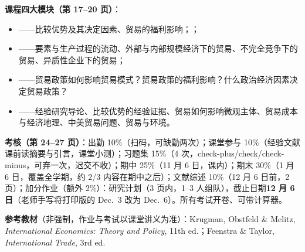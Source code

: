 
\textbf{课程四大模块（第 17--20 页）}：
\begin{itemize}
  \item {}——比较优势及其决定因素、贸易的福利影响；；
  \item {}——要素与生产过程的流动、外部与内部规模经济下的贸易、不完全竞争下的贸易、异质性企业下的贸易；
  \item {}——贸易政策如何影响贸易模式？贸易政策的福利影响？什么政治经济因素决定贸易政策？
  \item {}——经验研究导论、比较优势的经验证据、贸易如何影响微观主体、贸易成本与经济地理、中美贸易问题、贸易与环境。
\end{itemize}

\textbf{考核（第 24--27 页）}：出勤 10\%（扫码，可缺勤两次）；课堂参与 10\%（经验文献课前读摘要与引言，课堂小测）；习题集 15\%（4 次，check-plus/check/check-minus，可弃一次，迟交不收）；期中 25\%（11 月 6 日，课内）；期末 30\%（1 月 6 日，覆盖全学期，约 2/3 内容在期中之后）；文献综述 10\%（12 月 6 日前，2 页）；加分作业（额外 2\%）：研究计划（3 页内，1--3 人组队），截止日期\textbf{12 月 6 日}（老师手写将打印版的 Dec.~3 改为 Dec.~6）。所有考试开卷、可带计算器。

\textbf{参考教材}（非强制，作业与考试以课堂讲义为准）：Krugman, Obstfeld \& Melitz, \textit{International Economics: Theory and Policy}, 11th ed.；Feenstra \& Taylor, \textit{International Trade}, 3rd ed.


